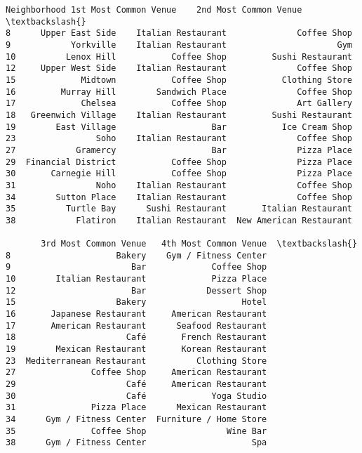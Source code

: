 \documentclass[11pt]{article}
\makeatletter
\newcommand{\boxspacing}{\kern\kvtcb@left@rule\kern\kvtcb@boxsep}
\newcommand{\prompt}[4]{
        \ttfamily\llap{{\color{#2}[#3]:\hspace{3pt}#4}}\vspace{-\baselineskip}
    }
\makeatother
\begin{document}
            \begin{tcolorbox}[breakable, size=fbox, boxrule=.5pt, pad at break*=1mm, opacityfill=0]
\prompt{Out}{outcolor}{68}{\boxspacing}
\begin{Verbatim}[commandchars=\\\{\}]
          Neighborhood 1st Most Common Venue    2nd Most Common Venue  \textbackslash{}
8      Upper East Side    Italian Restaurant              Coffee Shop
9            Yorkville    Italian Restaurant                      Gym
10          Lenox Hill           Coffee Shop         Sushi Restaurant
12     Upper West Side    Italian Restaurant              Coffee Shop
15             Midtown           Coffee Shop           Clothing Store
16         Murray Hill        Sandwich Place              Coffee Shop
17             Chelsea           Coffee Shop              Art Gallery
18   Greenwich Village    Italian Restaurant         Sushi Restaurant
19        East Village                   Bar           Ice Cream Shop
23                Soho    Italian Restaurant              Coffee Shop
27            Gramercy                   Bar              Pizza Place
29  Financial District           Coffee Shop              Pizza Place
30       Carnegie Hill           Coffee Shop              Pizza Place
31                Noho    Italian Restaurant              Coffee Shop
34        Sutton Place    Italian Restaurant              Coffee Shop
35          Turtle Bay      Sushi Restaurant       Italian Restaurant
38            Flatiron    Italian Restaurant  New American Restaurant

       3rd Most Common Venue   4th Most Common Venue  \textbackslash{}
8                     Bakery    Gym / Fitness Center
9                        Bar             Coffee Shop
10        Italian Restaurant             Pizza Place
12                       Bar            Dessert Shop
15                    Bakery                   Hotel
16       Japanese Restaurant     American Restaurant
17       American Restaurant      Seafood Restaurant
18                      Café       French Restaurant
19        Mexican Restaurant       Korean Restaurant
23  Mediterranean Restaurant          Clothing Store
27               Coffee Shop     American Restaurant
29                      Café     American Restaurant
30                      Café             Yoga Studio
31               Pizza Place      Mexican Restaurant
34      Gym / Fitness Center  Furniture / Home Store
35               Coffee Shop                Wine Bar
38      Gym / Fitness Center                     Spa


\end{Verbatim}
\end{tcolorbox}
\end{document}
